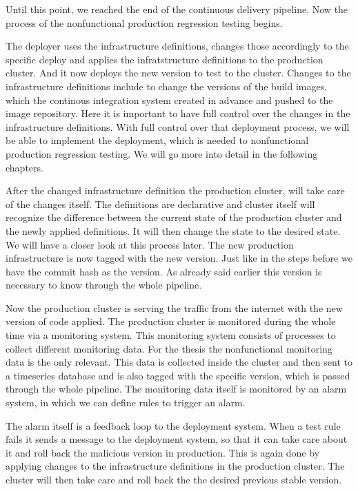 Until this point, we reached the end of the continuous delivery pipeline. Now the process of the nonfunctional production regression testing begins.

The deployer uses the infrastructure definitions, changes those accordingly to the specific deploy and applies the infratstructure definitions to the production cluster. And it now deploys the new version to test to the cluster. Changes to the infrastructure definitions include to change the versions of the build images, which the continous integration system created in advance and pushed to the image repository. Here it is important to have full control over the changes in the infrastructure definitions. With full control over that deployment process, we will be able to implement the deployment, which is needed to nonfunctional production regression testing. We will go more into detail in the following chapters.

After the changed infrastructure definition the production cluster, will take care of the changes itself. The definitions are declarative and cluster itself will recognize the difference between the current state of the production cluster and the newly applied definitions. It will then change the state to the desired state. We will have a closer look at this process later. The new production infrastructure is now tagged with the new version. Just like in the steps before we have the commit hash as the version. As already said earlier this version is necessary to know through the whole pipeline.

Now the production cluster is serving the traffic from the internet with the new version of code applied. The production cluster is monitored during the whole time via a monitoring system. This monitoring system consists of processes to collect different monitoring data. For the thesis the nonfunctional monitoring data is the only relevant. This data is collected inside the cluster and then sent to a timeseries database and is also tagged with the specific version, which is passed through the whole pipeline. The monitoring data itself is monitored by an alarm system, in which we can define rules to trigger an alarm.

The alarm itself is a feedback loop to the deployment system. When a test rule fails it sends a message to the deployment system, so that it can take care about it and roll back the malicious version in production. This is again done by applying changes to the infrastructure definitions in the production cluster. The cluster will then take care and roll back the the desired previous stable version.

